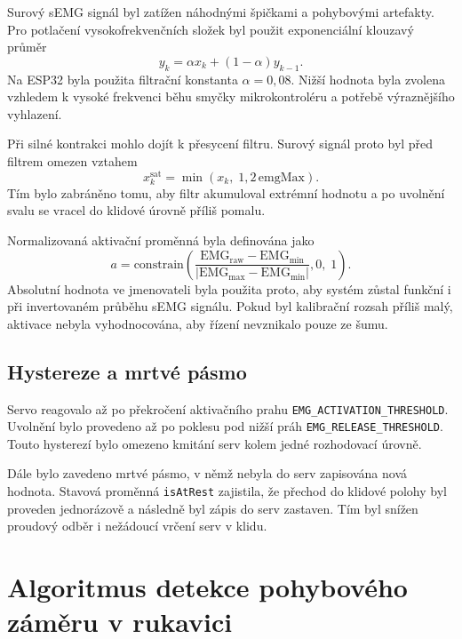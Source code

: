 Surový sEMG signál byl zatížen náhodnými špičkami a pohybovými artefakty. Pro potlačení vysokofrekvenčních složek byl použit exponenciální klouzavý průměr
\begin{equation}
    y_k = \alpha x_k + \left(1 - \alpha\right)y_{k-1}.
\end{equation}
Na ESP32 byla použita filtrační konstanta $\alpha = 0{,}08$. Nižší hodnota byla zvolena vzhledem k vysoké frekvenci běhu smyčky mikrokontroléru a potřebě výraznějšího vyhlazení.

Při silné kontrakci mohlo dojít k přesycení filtru. Surový signál proto byl před filtrem omezen vztahem
\begin{equation}
    x_k^{\mathrm{sat}} = \min\left(x_k,\;1{,}2\,\mathrm{emgMax}\right).
\end{equation}
Tím bylo zabráněno tomu, aby filtr akumuloval extrémní hodnotu a po uvolnění svalu se vracel do klidové úrovně příliš pomalu.

Normalizovaná aktivační proměnná byla definována jako
\begin{equation}
    a = \mathrm{constrain}\!\left(
        \frac{\mathrm{EMG}_{\mathrm{raw}} - \mathrm{EMG}_{\min}}
             {\left|\mathrm{EMG}_{\max} - \mathrm{EMG}_{\min}\right|},
        0,\;1
    \right).
\end{equation}
Absolutní hodnota ve jmenovateli byla použita proto, aby systém zůstal funkční i při invertovaném průběhu sEMG signálu. Pokud byl kalibrační rozsah příliš malý, aktivace nebyla vyhodnocována, aby řízení nevznikalo pouze ze šumu.

\subsection{Hystereze a mrtvé pásmo}
\label{subsec:hystereze-semgg}

Servo reagovalo až po překročení aktivačního prahu \texttt{EMG\_ACTIVATION\_THRESHOLD}. Uvolnění bylo provedeno až po poklesu pod nižší práh \texttt{EMG\_RELEASE\_THRESHOLD}. Touto hysterezí bylo omezeno kmitání serv kolem jedné rozhodovací úrovně.

Dále bylo zavedeno mrtvé pásmo, v němž nebyla do serv zapisována nová hodnota. Stavová proměnná \texttt{isAtRest} zajistila, že přechod do klidové polohy byl proveden jednorázově a následně byl zápis do serv zastaven. Tím byl snížen proudový odběr i nežádoucí vrčení serv v klidu.

\section{Algoritmus detekce pohybového záměru v rukavici}
\label{sec:algoritmus-zameru}

